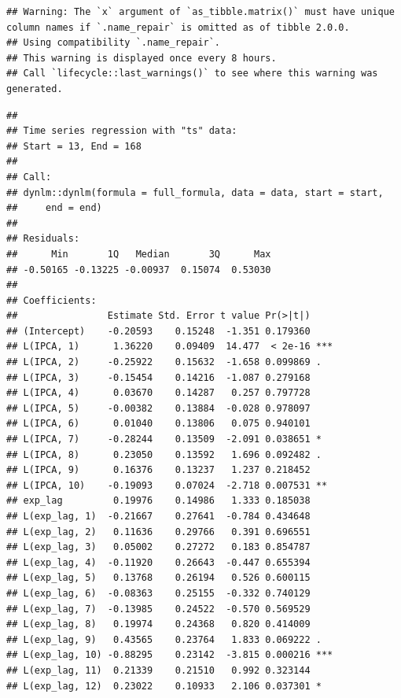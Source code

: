\documentclass[
]{article}
\newenvironment{Shaded}{\begin{snugshade}}{\end{snugshade}}
\newcommand{\KeywordTok}[1]{\textcolor[rgb]{0.13,0.29,0.53}{\textbf{#1}}}
\newcommand{\NormalTok}[1]{#1}
\newcommand{\OperatorTok}[1]{\textcolor[rgb]{0.81,0.36,0.00}{\textbf{#1}}}
\begin{document}
\begin{verbatim}
## Warning: The `x` argument of `as_tibble.matrix()` must have unique column names if `.name_repair` is omitted as of tibble 2.0.0.
## Using compatibility `.name_repair`.
## This warning is displayed once every 8 hours.
## Call `lifecycle::last_warnings()` to see where this warning was generated.
\end{verbatim}

\begin{Shaded}
\end{Shaded}

\begin{verbatim}
## 
## Time series regression with "ts" data:
## Start = 13, End = 168
## 
## Call:
## dynlm::dynlm(formula = full_formula, data = data, start = start, 
##     end = end)
## 
## Residuals:
##      Min       1Q   Median       3Q      Max 
## -0.50165 -0.13225 -0.00937  0.15074  0.53030 
## 
## Coefficients:
##                Estimate Std. Error t value Pr(>|t|)    
## (Intercept)    -0.20593    0.15248  -1.351 0.179360    
## L(IPCA, 1)      1.36220    0.09409  14.477  < 2e-16 ***
## L(IPCA, 2)     -0.25922    0.15632  -1.658 0.099869 .  
## L(IPCA, 3)     -0.15454    0.14216  -1.087 0.279168    
## L(IPCA, 4)      0.03670    0.14287   0.257 0.797728    
## L(IPCA, 5)     -0.00382    0.13884  -0.028 0.978097    
## L(IPCA, 6)      0.01040    0.13806   0.075 0.940101    
## L(IPCA, 7)     -0.28244    0.13509  -2.091 0.038651 *  
## L(IPCA, 8)      0.23050    0.13592   1.696 0.092482 .  
## L(IPCA, 9)      0.16376    0.13237   1.237 0.218452    
## L(IPCA, 10)    -0.19093    0.07024  -2.718 0.007531 ** 
## exp_lag         0.19976    0.14986   1.333 0.185038    
## L(exp_lag, 1)  -0.21667    0.27641  -0.784 0.434648    
## L(exp_lag, 2)   0.11636    0.29766   0.391 0.696551    
## L(exp_lag, 3)   0.05002    0.27272   0.183 0.854787    
## L(exp_lag, 4)  -0.11920    0.26643  -0.447 0.655394    
## L(exp_lag, 5)   0.13768    0.26194   0.526 0.600115    
## L(exp_lag, 6)  -0.08363    0.25155  -0.332 0.740129    
## L(exp_lag, 7)  -0.13985    0.24522  -0.570 0.569529    
## L(exp_lag, 8)   0.19974    0.24368   0.820 0.414009    
## L(exp_lag, 9)   0.43565    0.23764   1.833 0.069222 .  
## L(exp_lag, 10) -0.88295    0.23142  -3.815 0.000216 ***
## L(exp_lag, 11)  0.21339    0.21510   0.992 0.323144    
## L(exp_lag, 12)  0.23022    0.10933   2.106 0.037301 *  

\end{verbatim}
\end{document}
